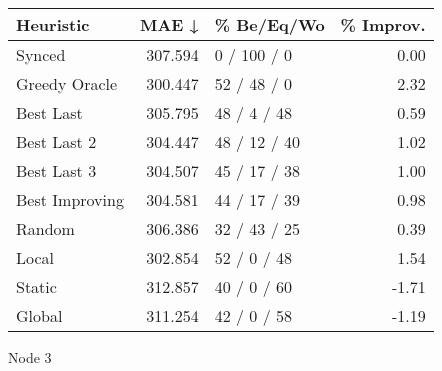 \begin{tabular}{lrlr}
\toprule
\textbf{Heuristic} & \textbf{MAE ↓} & \textbf{\% Be/Eq/Wo} & \textbf{\% Improv.} \\
\midrule
            Synced &        307.594 &          0 / 100 / 0 &                0.00 \\
     Greedy Oracle &        300.447 &          52 / 48 / 0 &                2.32 \\
         Best Last &        305.795 &          48 / 4 / 48 &                0.59 \\
       Best Last 2 &        304.447 &         48 / 12 / 40 &                1.02 \\
       Best Last 3 &        304.507 &         45 / 17 / 38 &                1.00 \\
    Best Improving &        304.581 &         44 / 17 / 39 &                0.98 \\
            Random &        306.386 &         32 / 43 / 25 &                0.39 \\
             Local &        302.854 &          52 / 0 / 48 &                1.54 \\
            Static &        312.857 &          40 / 0 / 60 &               -1.71 \\
            Global &        311.254 &          42 / 0 / 58 &               -1.19 \\
\bottomrule
\end{tabular}
\caption{Node 3}
\label{tab:iid_lr05_le1_bs2_3}

